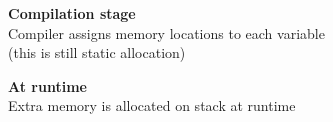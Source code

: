 \documentclass{../ucll-slides}
\begin{document}
\begin{frame}
\begin{columns}
\begin{center}
    \end{center}
  \end{columns}
  \vskip2cm
  \begin{overprint}
    \begin{center}
      \textbf{Compilation stage} \\ Compiler assigns memory locations to each variable \\ (this is still static allocation)
    \end{center}
    \begin{center}
      \textbf{At runtime} \\ Extra memory is allocated on stack at runtime
    \end{center}
  \end{overprint}
\end{frame}
\end{document}
